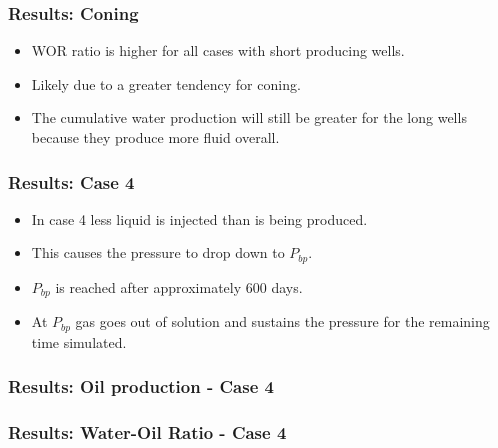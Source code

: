 \begin{frame}
    \frametitle{Results: Coning}
    \begin{itemize}
        \item WOR ratio is higher for all cases with short producing wells.
        \item Likely due to a greater tendency for coning.
        \item The cumulative water production will still be greater for the long wells because they produce more fluid overall.
    \end{itemize}
\end{frame}


\begin{frame}
    \frametitle{Results: Case 4}
    \begin{itemize}
        \item In case 4 less liquid is injected than is being produced.
        \item This causes the pressure to drop down to $P_{bp}$.
        \item $P_{bp}$ is reached after approximately 600 days.
        \item At $P_{bp}$ gas goes out of solution and sustains the pressure for the remaining time simulated.
    \end{itemize}
\end{frame}


\begin{frame}
    \frametitle{Results: Oil production - Case 4}
    \centerline{}
\end{frame}



\begin{frame}
    \frametitle{Results: Water-Oil Ratio - Case 4}
    \centerline{}
\end{frame}

